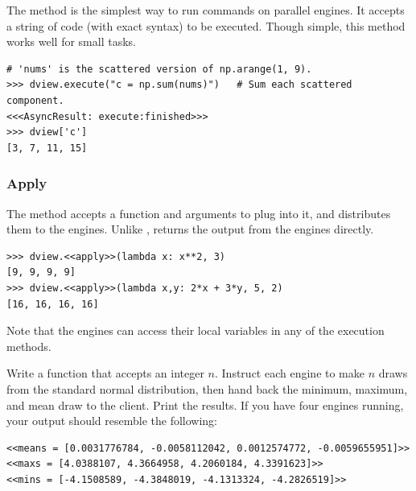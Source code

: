 The  method is the simplest way to run commands on parallel engines.
It accepts a string of code (with exact syntax) to be executed.
Though simple, this method works well for small tasks.

\begin{lstlisting}
# 'nums' is the scattered version of np.arange(1, 9).
>>> dview.execute("c = np.sum(nums)")   # Sum each scattered component.
<<<AsyncResult: execute:finished>>>
>>> dview['c']
[3, 7, 11, 15]
\end{lstlisting}

\subsubsection*{Apply} %

The  method accepts a function and arguments to plug into it, and distributes them to the engines.
Unlike ,  returns the output from the engines directly.

\begin{lstlisting}
>>> dview.<<apply>>(lambda x: x**2, 3)
[9, 9, 9, 9]
>>> dview.<<apply>>(lambda x,y: 2*x + 3*y, 5, 2)
[16, 16, 16, 16]
\end{lstlisting}

Note that the engines can access their local variables in any of the execution methods.

\begin{problem}
Write a function that accepts an integer $n$.
Instruct each engine to make $n$ draws from the standard normal distribution, then hand back the minimum, maximum, and mean draw to the client.
Print the results.
If you have four engines running, your output should resemble the following:
\begin{lstlisting}
<<means = [0.0031776784, -0.0058112042, 0.0012574772, -0.0059655951]>>
<<maxs = [4.0388107, 4.3664958, 4.2060184, 4.3391623]>>
<<mins = [-4.1508589, -4.3848019, -4.1313324, -4.2826519]>>
\end{lstlisting}
\label{prob:parallel-apply-basic}
\end{problem}

